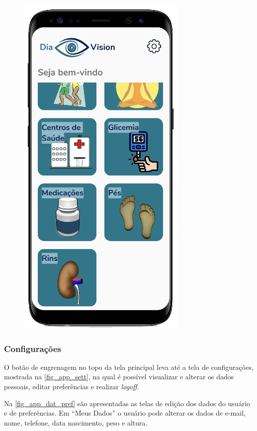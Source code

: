 \begin{figure}[htb]
\begin{minipage}{0.45\textwidth}
        \includegraphics[scale=0.66]{Imagens/desenvolvimento/app/app_inicio_2.png}
    \end{minipage}
\end{figure}

\subsubsection{Configurações}

O botão de engrenagem no topo da tela principal leva até a tela de configurações, mostrada na
\autoref{fig_app_sett}, na qual é possível visualizar e alterar os dados pessoais, editar preferências
e realizar \emph{logoff}.

Na \autoref{fig_app_dat_pref} são apresentadas as telas de edição dos dados do usuário e de preferências.
Em “Meus Dados” o usuário pode alterar os dados de e-mail, nome, telefone, data nascimento, peso e altura.

